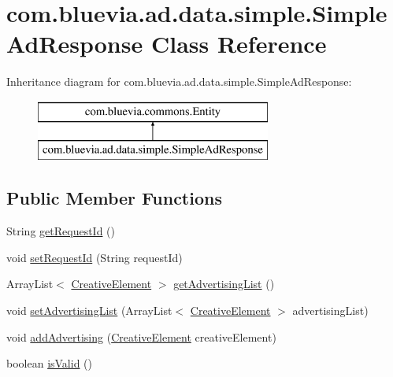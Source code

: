 \hypertarget{classcom_1_1bluevia_1_1ad_1_1data_1_1simple_1_1SimpleAdResponse}{
\section{com.bluevia.ad.data.simple.SimpleAdResponse Class Reference}
\label{classcom_1_1bluevia_1_1ad_1_1data_1_1simple_1_1SimpleAdResponse}
}
Inheritance diagram for com.bluevia.ad.data.simple.SimpleAdResponse:\begin{figure}[H]
\begin{center}
\leavevmode
\includegraphics[height=2.000000cm]{classcom_1_1bluevia_1_1ad_1_1data_1_1simple_1_1SimpleAdResponse}
\end{center}
\end{figure}
\subsection*{Public Member Functions}
\begin{DoxyCompactItemize}
\item 
String \hyperlink{classcom_1_1bluevia_1_1ad_1_1data_1_1simple_1_1SimpleAdResponse_a1ef9141ba3d53d7de292a8b39f891558}{getRequestId} ()
\item 
void \hyperlink{classcom_1_1bluevia_1_1ad_1_1data_1_1simple_1_1SimpleAdResponse_a34d43bf66b418cca88692f0cf143672e}{setRequestId} (String requestId)
\item 
ArrayList$<$ \hyperlink{classcom_1_1bluevia_1_1ad_1_1data_1_1simple_1_1CreativeElement}{CreativeElement} $>$ \hyperlink{classcom_1_1bluevia_1_1ad_1_1data_1_1simple_1_1SimpleAdResponse_a0d85969320dc302d7c874dc81372f472}{getAdvertisingList} ()
\item 
void \hyperlink{classcom_1_1bluevia_1_1ad_1_1data_1_1simple_1_1SimpleAdResponse_a02c1cbe288331c66bad53f129ae3b5fa}{setAdvertisingList} (ArrayList$<$ \hyperlink{classcom_1_1bluevia_1_1ad_1_1data_1_1simple_1_1CreativeElement}{CreativeElement} $>$ advertisingList)
\item 
void \hyperlink{classcom_1_1bluevia_1_1ad_1_1data_1_1simple_1_1SimpleAdResponse_a6fb42f2a27264f3eeece92024975c6cb}{addAdvertising} (\hyperlink{classcom_1_1bluevia_1_1ad_1_1data_1_1simple_1_1CreativeElement}{CreativeElement} creativeElement)
\item 
boolean \hyperlink{classcom_1_1bluevia_1_1ad_1_1data_1_1simple_1_1SimpleAdResponse_ad07540bcfd5dec9922a1171c3d141086}{isValid} ()
\end{DoxyCompactItemize}


